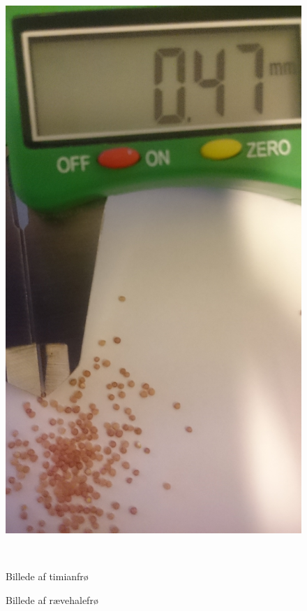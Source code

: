 \begin{figure}[htbp]
\begin{minipage}[b]{0.48\textwidth}
\end{minipage} \hfill
\begin{minipage}[b]{0.48\textwidth} \centering
\includegraphics[width=1.00\textwidth]{billeder/Hovedrapport/foxtail.jpg} %
\end{minipage} \\ %
\begin{minipage}[b]{0.48\textwidth}
\caption{Billede af timianfrø} %
\label{fig:timian}
\end{minipage} \hfill
\begin{minipage}[b]{0.48\textwidth}
\caption{Billede af rævehalefrø} %
\label{fig:foxtail}
\end{minipage}
\end{figure}

